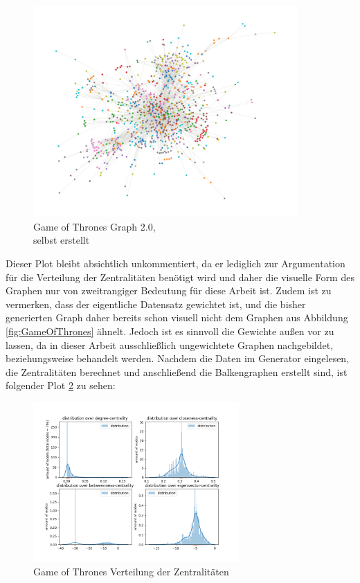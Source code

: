 \FloatBarrier
\begin{figure}[h!]%
  \centering
  \includegraphics[width=0.9\textwidth]{Graphics/GOTPlot.png}
  \caption{Game of Thrones Graph 2.0, \\
  selbst erstellt}
  \label{fig:GOT2.0}
\end{figure}
\FloatBarrier

Dieser Plot bleibt absichtlich unkommentiert, da er lediglich zur Argumentation für die Verteilung der Zentralitäten benötigt wird und daher die visuelle Form des Graphen nur von zweitrangiger Bedeutung für diese Arbeit ist. Zudem ist zu vermerken, dass der eigentliche Datensatz gewichtet ist, und die bisher generierten Graph daher bereits schon visuell nicht dem Graphen aus Abbildung \ref{fig:GameOfThrones} ähnelt. Jedoch ist es sinnvoll die Gewichte außen vor zu lassen, da in dieser Arbeit ausschließlich ungewichtete Graphen nachgebildet, beziehungsweise behandelt werden. Nachdem die Daten im Generator eingelesen, die Zentralitäten berechnet und anschließend die Balkengraphen erstellt sind, ist folgender Plot \ref{fig:distributionGOT} zu sehen:

\FloatBarrier
\begin{figure}[h!]%
  \centering
   \includegraphics[width=0.7\textwidth]{Graphics/GOT-Distribution.png}
  \caption{Game of Thrones Verteilung der Zentralitäten}
  \label{fig:distributionGOT}
\end{figure}
\FloatBarrier
 
